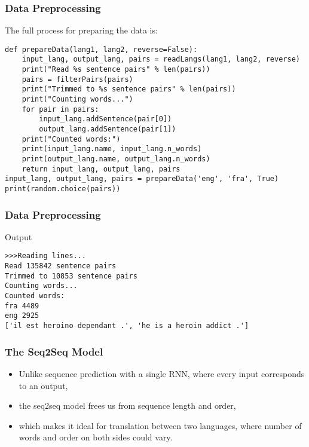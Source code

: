 \begin{frame}[fragile]
\frametitle{ Data Preprocessing}
The full process for preparing the data is:
\begin{lstlisting}    
def prepareData(lang1, lang2, reverse=False):
    input_lang, output_lang, pairs = readLangs(lang1, lang2, reverse)
    print("Read %s sentence pairs" % len(pairs))
    pairs = filterPairs(pairs)
    print("Trimmed to %s sentence pairs" % len(pairs))
    print("Counting words...")
    for pair in pairs:
        input_lang.addSentence(pair[0])
        output_lang.addSentence(pair[1])
    print("Counted words:")
    print(input_lang.name, input_lang.n_words)
    print(output_lang.name, output_lang.n_words)
    return input_lang, output_lang, pairs
input_lang, output_lang, pairs = prepareData('eng', 'fra', True)
print(random.choice(pairs))
\end{lstlisting} 
      
\end{frame} 

\begin{frame}[fragile]
\frametitle{ Data Preprocessing}
Output
\begin{lstlisting}    
>>>Reading lines...
Read 135842 sentence pairs
Trimmed to 10853 sentence pairs
Counting words...
Counted words:
fra 4489
eng 2925
['il est heroino dependant .', 'he is a heroin addict .']
\end{lstlisting} 
      
\end{frame} 

\begin{frame}[fragile]
\frametitle{The Seq2Seq Model}

\begin{itemize}
\item Unlike sequence prediction with a single RNN, where every input corresponds to an output, 
\item the seq2seq model frees us from sequence length and order, 
\item which makes it ideal for translation between two languages, where number of words and order on both sides could vary.
\end{itemize}
      
\end{frame} 

